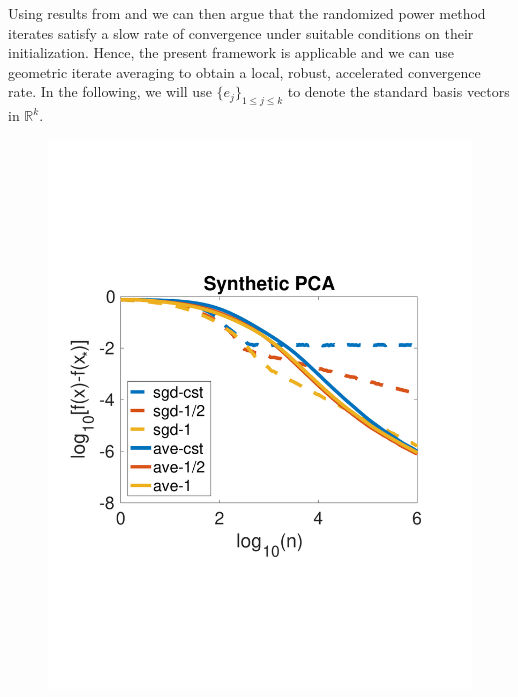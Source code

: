 Using results from  \citet{shamir2016fast} and  \citet{AllenLi2017-streampca} we can then argue that the randomized power method iterates satisfy a slow rate of convergence under suitable conditions on their initialization. Hence, the present framework is applicable and we can use geometric iterate averaging to obtain a local, robust, accelerated convergence rate. In the following, we will use $\{e_j \}_{1\leq j \leq k}$ to denote the standard basis vectors in $\mathbb{R}^k$.
  \begin{figure}[!t]
 \vspace{-2.4cm}
\centering
\begin{minipage}[c]{.45\linewidth}
\includegraphics[width=\linewidth]{Figs/gapgrand}
   \end{minipage}
    \hspace*{-10pt}
   \begin{minipage}[c]{.45\linewidth}

\end{minipage}
\end{figure}
